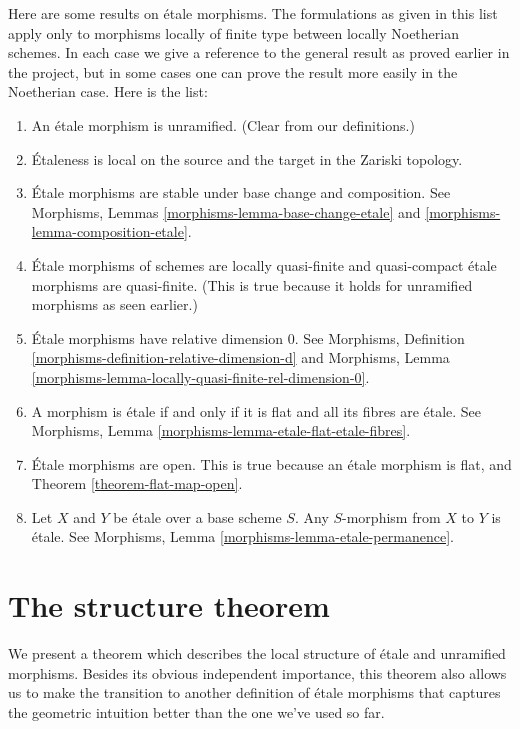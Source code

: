 \noindent
Here are some results on \'etale morphisms.
The formulations as given in this list apply only to
morphisms locally of finite type between locally Noetherian schemes.
In each case we give a reference to the general result as
proved earlier in the project, but in some cases one can
prove the result more easily in the Noetherian case.
Here is the list:
\begin{enumerate}
\item An \'etale morphism is unramified. (Clear from our definitions.)
\item \'Etaleness is local on the source and the target in the Zariski
topology.
\item \'Etale morphisms are stable under base change and composition.
See Morphisms, Lemmas \ref{morphisms-lemma-base-change-etale}
and \ref{morphisms-lemma-composition-etale}.
\item \'Etale morphisms of schemes are locally quasi-finite
and quasi-compact \'etale morphisms are quasi-finite. (This is
true because it holds for unramified morphisms as seen earlier.)
\item \'Etale morphisms have relative dimension $0$. See
Morphisms, Definition \ref{morphisms-definition-relative-dimension-d}
and
Morphisms, Lemma \ref{morphisms-lemma-locally-quasi-finite-rel-dimension-0}.
\item A morphism is \'etale if and only if it is flat and
all its fibres are \'etale. See
Morphisms, Lemma \ref{morphisms-lemma-etale-flat-etale-fibres}.
\item \'Etale morphisms are open. This is true because an \'etale
morphism is flat, and Theorem \ref{theorem-flat-map-open}.
\item Let $X$ and $Y$ be \'etale over a base scheme $S$.
Any $S$-morphism from $X$ to $Y$ is \'etale.
See Morphisms, Lemma \ref{morphisms-lemma-etale-permanence}.
\end{enumerate}






\section{The structure theorem}
\label{section-structure-etale-map}

\noindent
We present a theorem which describes the local structure of \'etale
and unramified morphisms. Besides its obvious independent importance,
this theorem also allows us to make the transition to another
definition of \'etale morphisms that captures the geometric intuition better
than the one we've used so far.

